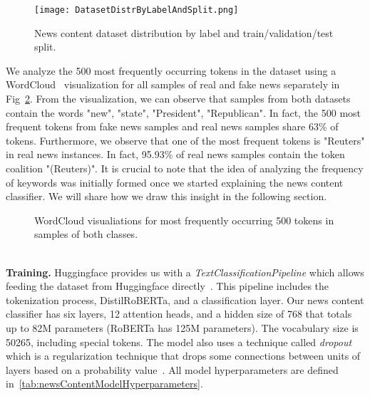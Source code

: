 \begin{figure}
    \centering
    \texttt{[image: DatasetDistrByLabelAndSplit.png]}
    \caption[News content dataset distribution by label and train/validation/test split.]{News content dataset distribution by label and train/validation/test split.}
    \label{fig:DatasetDistributionByLabelAndSplit}
\end{figure}
We analyze the 500 most frequently occurring tokens in the dataset using a WordCloud~\parencite{WordCloud_Oesper} visualization for all samples of real and fake news separately in Fig~\ref{fig:WordCloudVisualizations}. From the visualization, we can observe that samples from both datasets contain the words "new", "state", "President", "Republican". In fact, the 500 most frequent tokens from fake news samples and real news samples share 63\% of tokens. Furthermore, we observe that one of the most frequent tokens is "Reuters" in real news instances. In fact, 95.93\% of real news samples contain the token coalition "(Reuters)". It is crucial to note that the idea of analyzing the frequency of keywords was initially formed once we started explaining the news content classifier. We will share how we draw this insight in the following section.\\
\begin{figure}
    \centering
    \hfill
    \caption[WordCloud visualiations for most frequently occurring 500 tokens in both classes.]{WordCloud visualiations for most frequently occurring 500 tokens in samples of both classes.}
    \label{fig:WordCloudVisualizations}
\end{figure}\\
\textbf{Training.} Huggingface provides us with a \emph{TextClassificationPipeline} which allows feeding the dataset from Huggingface directly~\parencite{Transformers_Wolf}. This pipeline includes the tokenization process, DistilRoBERTa, and a classification layer. Our news content classifier has six layers, 12 attention heads, and a hidden size of 768 that totals up to 82M parameters (RoBERTa has 125M parameters). The vocabulary size is 50265, including special tokens. The model also uses a technique called \emph{dropout} which is a regularization technique that drops some connections between units of layers based on a probability value~\parencite{Dropout_Nitish}. All model hyperparameters are defined in~\ref{tab:newsContentModelHyperparameters}.\\
